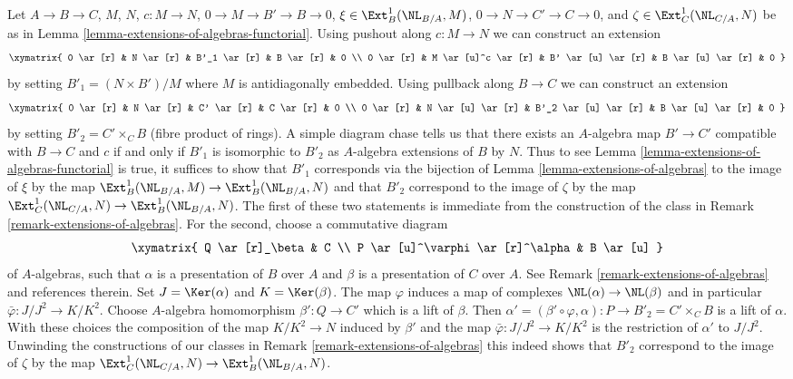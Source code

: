 \begin{remark}
\label{remark-extensions-of-algebras-functorial}
Let $A \to B \to C$, $M$, $N$, $c : M \to N$,
$0 \to M \to B' \to B \to 0$, $\xi \in \Ext^1_B(\NL_{B/A}, M)$,
$0 \to N \to C' \to C \to 0$, and $\zeta \in \Ext^1_C(\NL_{C/A}, N)$ be as in
Lemma \ref{lemma-extensions-of-algebras-functorial}.
Using pushout along $c : M \to N$ we can construct an extension
$$
\xymatrix{
0 \ar[r] & N \ar[r] & B'_1 \ar[r] & B \ar[r] & 0 \\
0 \ar[r] & M \ar[u]^c \ar[r] & B' \ar[u] \ar[r] & B \ar[u] \ar[r] & 0
}
$$
by setting $B'_1 = (N \times B')/M$ where $M$ is antidiagonally
embedded. Using pullback along $B \to C$ we can construct an extension
$$
\xymatrix{
0 \ar[r] & N \ar[r] & C' \ar[r] & C \ar[r] & 0 \\
0 \ar[r] & N \ar[u] \ar[r] & B'_2 \ar[u] \ar[r] & B \ar[u] \ar[r] & 0
}
$$
by setting $B'_2 = C' \times_C B$ (fibre product of rings). A simple diagram
chase tells us that there exists an $A$-algebra map $B' \to C'$
compatible with $B \to C$ and $c$ if and only if $B'_1$ is isomorphic
to $B'_2$ as $A$-algebra extensions of $B$ by $N$. Thus to see
Lemma \ref{lemma-extensions-of-algebras-functorial}
is true, it suffices to show that $B'_1$ corresponds via the bijection of
Lemma \ref{lemma-extensions-of-algebras}
to the image of $\xi$ by the map
$\Ext^1_B(\NL_{B/A}, M) \to \Ext^1_B(\NL_{B/A}, N)$
and that $B'_2$ correspond to the image of $\zeta$ by the map
$\Ext^1_C(\NL_{C/A}, N) \to \Ext^1_B(\NL_{B/A}, N)$.
The first of these two statements is immediate from the construction
of the class in Remark \ref{remark-extensions-of-algebras}.
For the second, choose a commutative diagram
$$
\xymatrix{
Q \ar[r]_\beta & C \\
P \ar[u]^\varphi \ar[r]^\alpha & B \ar[u]
}
$$
of $A$-algebras, such that $\alpha$ is a presentation of $B$ over $A$
and $\beta$ is a presentation of $C$ over $A$. See
Remark \ref{remark-extensions-of-algebras} and references therein.
Set $J = \Ker(\alpha)$ and $K = \Ker(\beta)$. The map $\varphi$
induces a map of complexes $\NL(\alpha) \to \NL(\beta)$
and in particular $\bar\varphi : J/J^2 \to K/K^2$.
Choose $A$-algebra homomorphism $\beta' : Q \to C'$
which is a lift of $\beta$. Then
$\alpha' = (\beta' \circ \varphi, \alpha) : P \to B'_2 = C' \times_C B$
is a lift of $\alpha$. With these choices the composition of the map
$K/K^2 \to N$ induced by $\beta'$ and the map $\bar\varphi : J/J^2 \to K/K^2$
is the restriction of $\alpha'$ to $J/J^2$.
Unwinding the constructions of our classes in
Remark \ref{remark-extensions-of-algebras}
this indeed shows that
$B'_2$ correspond to the image of $\zeta$ by the map
$\Ext^1_C(\NL_{C/A}, N) \to \Ext^1_B(\NL_{B/A}, N)$.
\end{remark}

